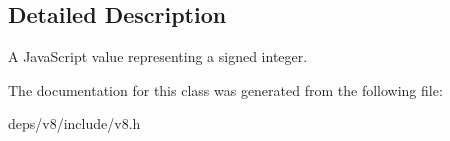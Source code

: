 \subsection{Detailed Description}
A Java\+Script value representing a signed integer. 

The documentation for this class was generated from the following file\+:\begin{DoxyCompactItemize}
\item 
deps/v8/include/v8.\+h\end{DoxyCompactItemize}
